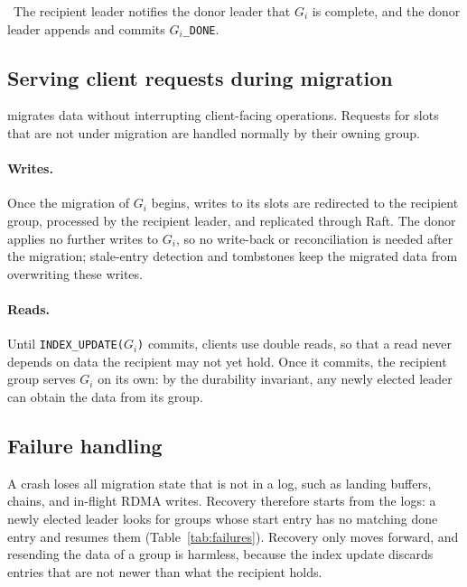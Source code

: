 ~The recipient leader notifies the donor leader that $G_i$ is complete, and the donor leader appends and commits \texttt{$G_i$\_DONE}.

\subsection{Serving client requests during migration}
\label{sec:serving-during-migration}

\OurImplementation{} migrates data without interrupting client-facing operations.
Requests for slots that are not under migration are handled normally by their owning group.

\paragraph{Writes.}
Once the migration of $G_i$ begins, writes to its slots are redirected to the recipient group, processed by the recipient leader, and replicated through Raft.
The donor applies no further writes to $G_i$, so no write-back or reconciliation is needed after the migration; stale-entry detection and tombstones keep the migrated data from overwriting these writes.

\paragraph{Reads.}
Until \texttt{INDEX\_UPDATE($G_i$)} commits, clients use double reads, so that a read never depends on data the recipient may not yet hold.
Once it commits, the recipient group serves $G_i$ on its own: by the durability invariant, any newly elected leader can obtain the data from its group.

\subsection{Failure handling}
\label{sec:failure-handling}

A crash loses all migration state that is not in a log, such as landing buffers, chains, and in-flight RDMA writes.
Recovery therefore starts from the logs: a newly elected leader looks for groups whose start entry has no matching done entry and resumes them (Table~\ref{tab:failures}).
Recovery only moves forward, and resending the data of a group is harmless, because the index update discards entries that are not newer than what the recipient holds.

